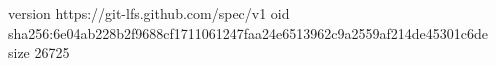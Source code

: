 version https://git-lfs.github.com/spec/v1
oid sha256:6e04ab228b2f9688cf1711061247faa24e6513962c9a2559af214de45301c6de
size 26725

